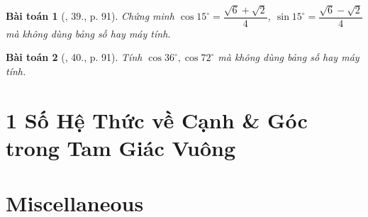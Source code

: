 \documentclass{article}
\newtheorem{baitoan}{Bài toán}
\begin{document}
\begin{baitoan}[\cite{Binh_Toan_9_tap_1}, 39., p. 91]
	Chứng minh $\cos15^\circ = \dfrac{\sqrt{6} + \sqrt{2}}{4}$, $\sin15^\circ = \dfrac{\sqrt{6} - \sqrt{2}}{4}$ mà không dùng bảng số hay máy tính.
\end{baitoan}

\begin{baitoan}[\cite{Binh_Toan_9_tap_1}, 40., p. 91]
	Tính $\cos36^\circ,\cos72^\circ$ mà không dùng bảng số hay máy tính.
\end{baitoan}


\section{1 Số Hệ Thức về Cạnh \& Góc trong Tam Giác Vuông}


\section{Miscellaneous}


\printbibliography[heading=bibintoc]
	
\end{document}
